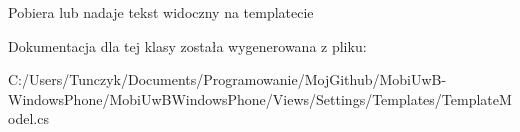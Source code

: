 Pobiera lub nadaje tekst widoczny na template\textquotesingle{}cie 



Dokumentacja dla tej klasy została wygenerowana z pliku\+:\begin{DoxyCompactItemize}
\item 
C\+:/\+Users/\+Tunczyk/\+Documents/\+Programowanie/\+Moj\+Github/\+Mobi\+Uw\+B-\/\+Windows\+Phone/\+Mobi\+Uw\+B\+Windows\+Phone/\+Views/\+Settings/\+Templates/Template\+Model.\+cs\end{DoxyCompactItemize}
